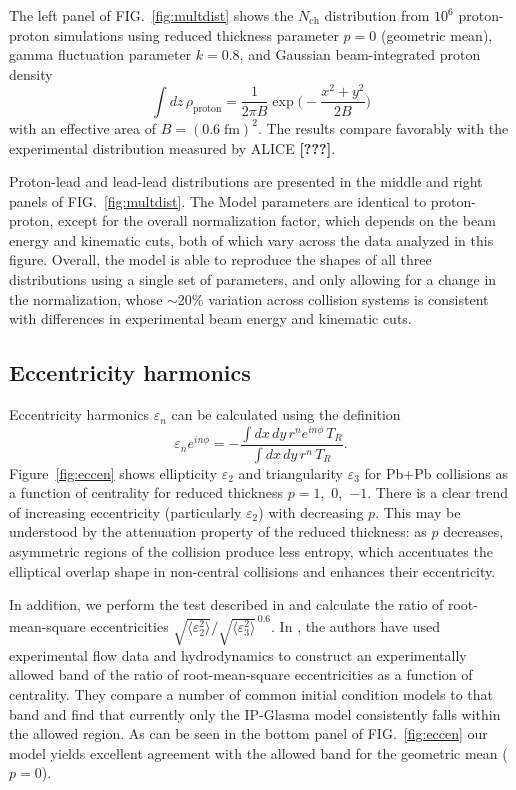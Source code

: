 \documentclass[aps,prl,reprint,amsmath,nofootinbib]{revtex4-1}
\newcommand{\nch}{N_\text{ch}}
\newcommand{\eccratio}{\sqrt{\langle \varepsilon_2^2 \rangle}/\sqrt{\langle \varepsilon_3^2 \rangle}^{\,0.6}}
\newcommand{\needcite}{\textbf{[???]}}
\begin{document}
The left panel of FIG.~\ref{fig:multdist} shows the $\nch$ distribution from $10^6$ proton-proton simulations
using reduced thickness parameter $p = 0$ (geometric mean), gamma fluctuation parameter $k = 0.8$, and
Gaussian beam-integrated proton density
\begin{equation}
  \int dz \, \rho_\text{proton} = \frac{1}{2\pi B} \exp\biggr( -\frac{x^2 + y^2}{2B} \biggr)
\end{equation}
with an effective area of $B = (0.6\;\text{fm})^2$.  The results compare favorably with the experimental distribution
measured by ALICE \needcite.

Proton-lead and lead-lead distributions are presented in the middle and right panels of
FIG.~\ref{fig:multdist}. The Model parameters are  identical to proton-proton, except for the overall normalization factor, which depends on the beam energy and kinematic cuts, both of which vary across the data analyzed in this figure.
Overall, the model is able to reproduce the shapes of all three distributions using a single set of parameters, and only allowing for a change in the normalization, whose $\sim$20\% variation across collision systems is consistent with differences in experimental beam energy and kinematic cuts.

\subsection{Eccentricity harmonics}

Eccentricity harmonics $\varepsilon_n$ can be calculated using the definition
\begin{equation}
  \varepsilon_n e^{i n\phi} = -\frac{\int dx \, dy\, r^n e^{i n \phi} \, T_R}{\int dx \, dy \, r^n \, T_R}.
\end{equation}
Figure~\ref{fig:eccen} shows ellipticity $\varepsilon_2$ and triangularity $\varepsilon_3$ for Pb+Pb collisions as a function of
centrality for reduced thickness $p = 1$,~0,~$-1$.  There is a clear trend of increasing eccentricity
(particularly $\varepsilon_2$) with decreasing $p$.  This may be understood by the attenuation property of the
reduced thickness:  as $p$ decreases, asymmetric regions of the collision produce less entropy, which
accentuates the elliptical overlap shape in non-central collisions and enhances their eccentricity.

In addition, we perform the test described in \cite{Retinskaya:2013gca} and calculate the ratio of root-mean-square eccentricities
$\eccratio$.  In \cite{Retinskaya:2013gca}, the authors have used experimental flow data
and hydrodynamics to construct an experimentally allowed band of the ratio of root-mean-square eccentricities
as a function of centrality.  They compare a number of common initial condition models to that band and find that
currently only the IP-Glasma model consistently falls within the allowed region.  As can be seen in the bottom panel of FIG.~\ref{fig:eccen} our model yields excellent agreement with the allowed band for
the geometric mean ($p = 0$).
\end{document}
